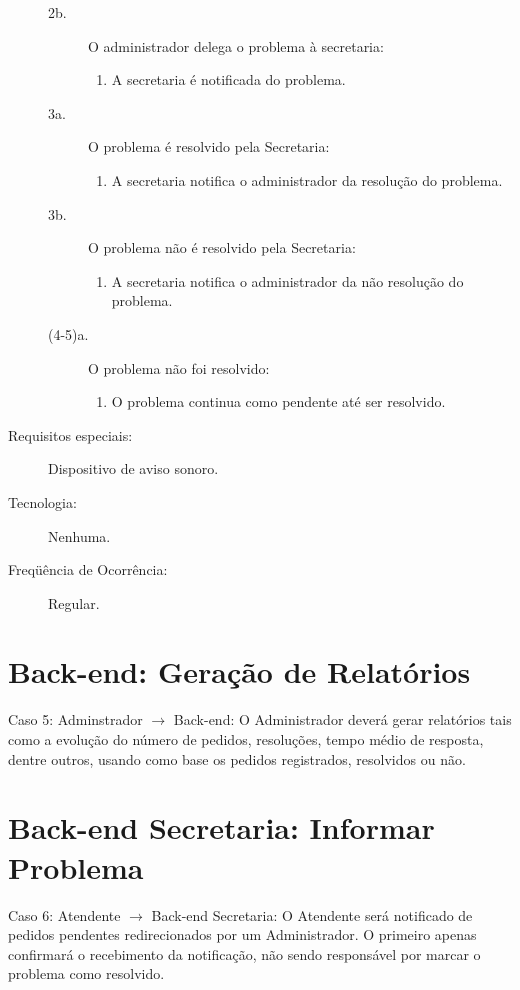 \documentclass[brazil,times]{abnt}
\begin{document}
\begin{description}
\begin{description}
	\item[2b.] O administrador delega o problema à secretaria:
	\begin{enumerate}
  		\item A secretaria é notificada do problema.
	\end{enumerate}

	\item[3a.] O problema é resolvido pela Secretaria:
	\begin{enumerate}
  		\item A secretaria notifica o administrador da resolução do problema.
	\end{enumerate}

	\item[3b.] O problema não é resolvido pela Secretaria:
	\begin{enumerate}
  		\item A secretaria notifica o administrador da não resolução do problema.
	\end{enumerate}

	\item[(4-5)a.] O problema não foi resolvido:
	\begin{enumerate}
  		\item O problema continua como pendente até ser resolvido.
	\end{enumerate}
\end{description}

\item[Requisitos especiais:] Dispositivo de aviso sonoro.
\item[Tecnologia:] Nenhuma.
\item[Freqüência de Ocorrência:] Regular.

\end{description}
\section{Back-end: Geração de Relatórios}
     Caso 5: Adminstrador $\rightarrow$ Back-end: O Administrador deverá gerar
     relatórios tais como a evolução do número de pedidos, resoluções, tempo médio de resposta, dentre outros, usando como base os pedidos registrados, resolvidos ou não.

\section{Back-end Secretaria: Informar Problema}
     Caso 6: Atendente $\rightarrow$ Back-end Secretaria: O Atendente será
     notificado de pedidos pendentes redirecionados por um Administrador. O primeiro apenas confirmará o recebimento da notificação, não sendo responsável por marcar o problema como resolvido.
\end{document}
